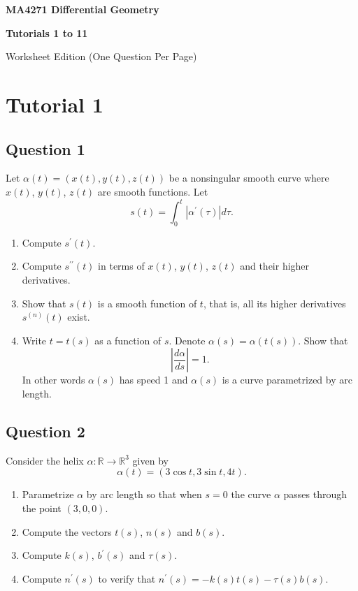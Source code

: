 \documentclass[12pt, a4paper]{article}
\newcommand{\R}{\mathbb{R}}
\begin{document}
\begin{titlepage}
    \centering
    \vspace*{2in}
    {\Huge \bfseries MA4271 Differential Geometry \par}
    \vspace{0.5in}
    {\Large \bfseries Tutorials 1 to 11 \par}
    \vspace{0.5in}
    {\large Worksheet Edition (One Question Per Page) \par}
    \vfill
\end{titlepage}

\tableofcontents
\newpage

\section*{Tutorial 1}

\subsection*{Question 1}
Let $\alpha(t)=(x(t),y(t),z(t))$ be a nonsingular smooth curve where $x(t)$, $y(t)$, $z(t)$ are smooth functions. Let
\[ s(t)=\int_{0}^{t}|\alpha^{\prime}(\tau)|d\tau. \]
\begin{enumerate}[label=(\roman*)]
    \item Compute $s^{\prime}(t)$.
    \item Compute $s^{\prime\prime}(t)$ in terms of $x(t)$, $y(t)$, $z(t)$ and their higher derivatives.
    \item Show that $s(t)$ is a smooth function of $t$, that is, all its higher derivatives $s^{(n)}(t)$ exist.
    \item Write $t=t(s)$ as a function of $s$. Denote $\alpha(s)=\alpha(t(s))$. Show that
    \[ \left|\frac{d\alpha}{ds}\right|=1. \]
    In other words $\alpha(s)$ has speed 1 and $\alpha(s)$ is a curve parametrized by arc length.
\end{enumerate}
\newpage

\subsection*{Question 2}
Consider the helix $\alpha:\R\rightarrow\R^{3}$ given by
\[ \alpha(t)=(3\cos t, 3\sin t, 4t). \]
\begin{enumerate}[label=(\roman*)]
    \item Parametrize $\alpha$ by arc length so that when $s=0$ the curve $\alpha$ passes through the point $(3, 0, 0)$.
    \item Compute the vectors $t(s)$, $n(s)$ and $b(s)$.
    \item Compute $k(s)$, $b^{\prime}(s)$ and $\tau(s)$.
    \item Compute $n^{\prime}(s)$ to verify that $n^{\prime}(s)=-k(s)t(s)-\tau(s)b(s)$.
\end{enumerate}
\end{document}
